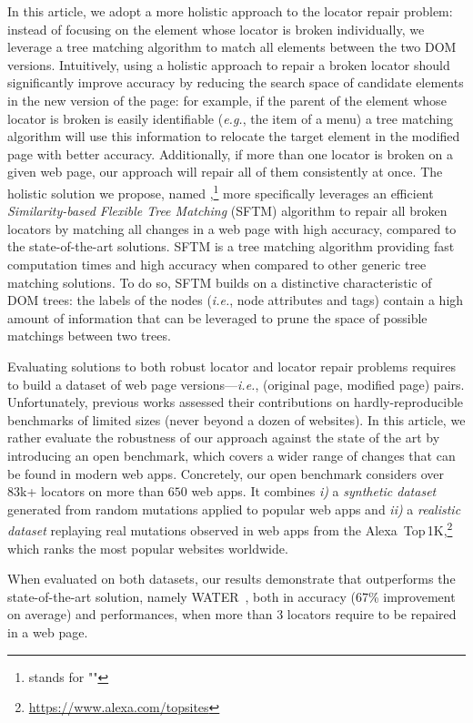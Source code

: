 In this article, we adopt a more holistic approach to the locator repair problem: instead of focusing on the element whose locator is broken individually, we leverage a tree matching algorithm to match all elements between the two DOM versions. 
Intuitively, using a holistic approach to repair a broken locator should significantly improve accuracy by reducing the search space of candidate elements in the new version of the page: for example, if the parent of the element whose locator is broken is easily identifiable (\emph{e.g.}, the item of a menu) a tree matching algorithm will use this information to relocate the target element in the modified page with better accuracy.
Additionally, if more than one locator is broken on a given web page, our approach will repair all of them consistently at once.
The holistic solution we propose, named \erratum{},\footnote{\erratum{} stands for "\erratumlong{}"} more specifically leverages an efficient \emph{Similarity-based Flexible Tree Matching} (SFTM) algorithm to repair all broken locators by matching all changes in a web page with high accuracy, compared to the state-of-the-art solutions.
SFTM is a tree matching algorithm providing fast computation times and high accuracy when compared to other generic tree matching solutions.
To do so, SFTM builds on a distinctive characteristic of DOM trees: the labels of the nodes (\emph{i.e.}, node attributes and tags) contain a high amount of information that can be leveraged to prune the space of possible matchings between two trees.

Evaluating solutions to both robust locator and locator repair problems requires to build a dataset of web page versions---\emph{i.e.}, \textsf{(original page, modified page)} pairs.
Unfortunately, previous works assessed their contributions on hardly-reproducible benchmarks of limited sizes (never beyond a dozen of websites).
In this article, we rather evaluate the robustness of our approach against the state of the art by introducing an open benchmark, which covers a wider range of changes that can be found in modern web apps.
Concretely, our open benchmark considers over 83k+ locators on more than $650$ web apps.
It combines \emph{i)} a \emph{synthetic dataset} generated from random mutations applied to popular web apps and \emph{ii)} a \emph{realistic dataset} replaying real mutations observed in web apps from the Alexa~Top\,1K,\footnote{\url{https://www.alexa.com/topsites}} which ranks the most popular websites worldwide.

When evaluated on both datasets, our results demonstrate that \erratum{} outperforms the state-of-the-art solution, namely WATER~\cite{choudhary2011water}, both in accuracy (67\% improvement on average) and performances, when more than 3 locators require to be repaired in a web page.

